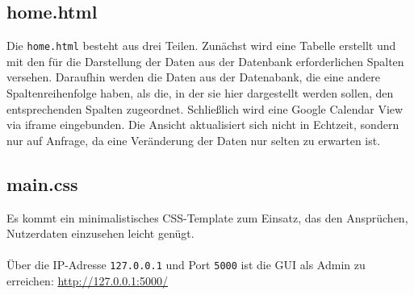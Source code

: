         \subsection{home.html} \label{home.html}
            Die \verb|home.html| besteht aus drei Teilen. Zunächst wird eine Tabelle erstellt und mit den für die Darstellung der Daten aus der Datenbank erforderlichen Spalten versehen. Daraufhin werden die Daten aus der Datenabank, die eine andere Spaltenreihenfolge haben, als die, in der sie hier dargestellt werden sollen, den entsprechenden Spalten zugeordnet.
            Schließlich wird eine Google Calendar View via iframe eingebunden.
            Die Ansicht aktualisiert sich nicht in Echtzeit, sondern nur auf Anfrage, da eine Veränderung der Daten nur selten zu erwarten ist.

        \subsection{main.css} \label{main.css}
            Es kommt ein minimalistisches CSS-Template zum Einsatz, das den Ansprüchen, Nutzerdaten einzusehen leicht genügt.\\ \\

        Über die IP-Adresse \verb|127.0.0.1| und Port \verb|5000| ist die GUI als Admin zu erreichen: \url{http://127.0.0.1:5000/}


